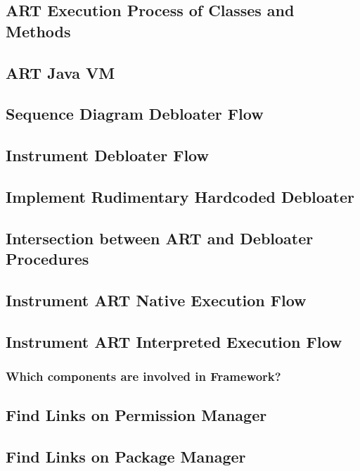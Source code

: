 \subsection{ART Execution Process of Classes and Methods}

\subsection{ART Java VM}

\subsection{Sequence Diagram Debloater Flow}

\subsection{Instrument Debloater Flow}

\subsection{Implement Rudimentary Hardcoded Debloater}

\subsection{Intersection between ART and Debloater Procedures}

\subsection{Instrument ART Native Execution Flow}

\subsection{Instrument ART Interpreted Execution Flow}

\subsubsection{Which components are involved in Framework?}
\subsection{Find Links on Permission Manager}
\subsection{Find Links on Package Manager}
